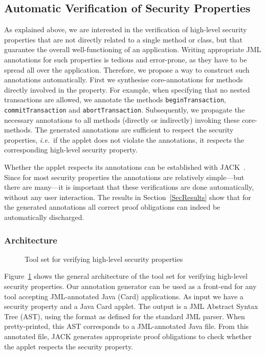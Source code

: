 \subsection{Automatic Verification of Security Properties}\label{SecVerif}

As explained above, we are interested in the verification of
high-level security properties that are not directly related to a
single method or class, but that guarantee the overall
well-functioning of an application. Writing appropriate JML
annotations for such properties is tedious and error-prone, as they
have to be spread all over the application. Therefore, we propose a
way to construct such annotations automatically. First we synthesise
core-annotations for methods directly involved in the property.  For
example, when specifying that no nested transactions are allowed, we
annotate the methods \texttt{beginTransaction},
\texttt{commitTransaction} and
\texttt{abortTransaction}. Subsequently, we propagate the necessary 
annotations to all methods (directly or indirectly) invoking these
core-methods.  The generated annotations are sufficient to respect the
security properties, \emph{i.e.}~if the applet does not violate the
annotations, it respects the corresponding high-level security
property.

Whether the applet respects its annotations can be established with
JACK~\cite{BRL-JACK}.
Since
for most security properties the annotations are relatively
simple---but there are many---it is important that these verifications
are done automatically, without any user interaction. The results in
Section~\ref{SecResults} show that for the generated annotations all
correct proof obligations can indeed be automatically discharged.

\subsubsection{Architecture}

\begin{figure}[p]
\begin{center}
\end{center}
\caption{\sc Tool set for verifying high-level security properties}\label{FigArch}
\end{figure}



Figure~\ref{FigArch} shows the general architecture of the tool set
for verifying high-level security properties. Our annotation generator
can be used as a front-end for any tool accepting JML-annotated Java
(Card) applications. As input we have a security property and a Java
Card applet. The output is a JML Abstract Syntax Tree (AST), using the
format as defined for the standard JML parser. When pretty-printed,
this AST corresponds to a JML-annotated Java file. From this
annotated file, JACK generates appropriate proof obligations to check
whether the applet respects the security property.

